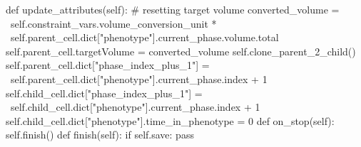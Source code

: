 \begin{python}
    def update_attributes(self):
        # resetting target volume
        converted_volume = \ 
            self.constraint_vars.volume_conversion_unit * \
                self.parent_cell.dict["phenotype"].current_phase.volume.total
        self.parent_cell.targetVolume = converted_volume
        self.clone_parent_2_child()
        self.parent_cell.dict["phase_index_plus_1"] = \ 
            self.parent_cell.dict["phenotype"].current_phase.index + 1
        self.child_cell.dict["phase_index_plus_1"] = \ 
            self.child_cell.dict["phenotype"].current_phase.index + 1
        self.child_cell.dict["phenotype"].time_in_phenotype = 0
    def on_stop(self):
        self.finish()
    def finish(self):
        if self.save:
            pass
\end{python}


